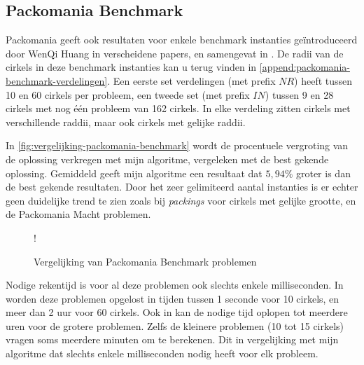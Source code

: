 \documentclass[12pt,a4paper,oneside]{book}
\begin{document}
\subsection{Packomania Benchmark}

Packomania geeft ook resultaten voor enkele benchmark instanties geïntroduceerd door WenQi Huang in verscheidene papers, en samengevat in \cite{huang2006new}.
De radii van de cirkels in deze benchmark instanties kan u terug vinden in \autoref{append:packomania-benchmark-verdelingen}.
Een eerste set verdelingen (met prefix $NR$) heeft tussen 10 en 60 cirkels per probleem, een tweede set (met prefix $IN$) tussen 9 en 28 cirkels met nog één probleem van 162 cirkels.
In elke verdeling zitten cirkels met verschillende raddii, maar ook cirkels met gelijke raddii.

In \autoref{fig:vergelijking-packomania-benchmark} wordt de procentuele vergroting van de oplossing verkregen met mijn algoritme, vergeleken met de best gekende oplossing.
Gemiddeld geeft mijn algoritme een resultaat dat $5,94\%$ groter is dan de best gekende resultaten.
Door het zeer gelimiteerd aantal instanties is er echter geen duidelijke trend te zien zoals bij \textit{packings} voor cirkels met gelijke grootte, en de Packomania Macht problemen.

\begin {figure}
	\centering
	 {!} {
	}
	\caption{Vergelijking van Packomania Benchmark problemen}
	\label{fig:vergelijking-packomania-benchmark}
\end {figure}

Nodige rekentijd is voor al deze problemen ook slechts enkele milliseconden.
In \cite{ye2013iterated} worden deze problemen opgelost in tijden tussen 1 seconde voor 10 cirkels, en meer dan 2 uur voor 60 cirkels.
Ook in \cite{huang2013tabu} kan de nodige tijd oplopen tot meerdere uren voor de grotere problemen.
Zelfs de kleinere problemen (10 tot 15 cirkels) vragen soms meerdere minuten om te berekenen.
Dit in vergelijking met mijn algoritme dat slechts enkele milliseconden nodig heeft voor elk probleem.
\end{document}
